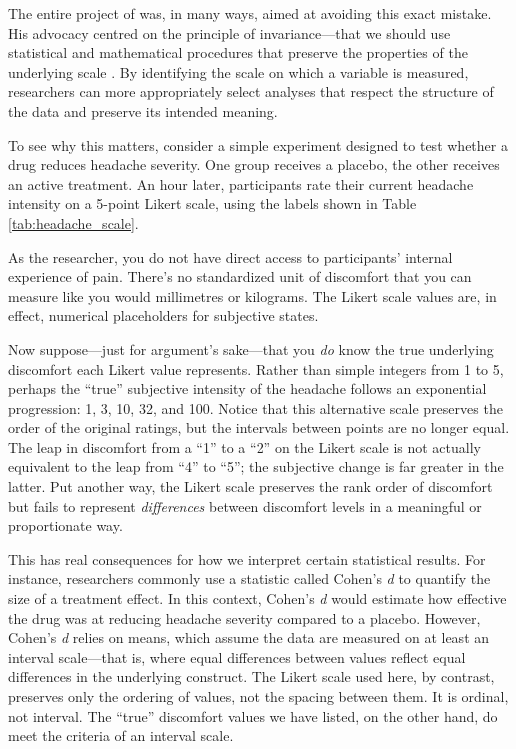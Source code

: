 The entire project of \textcite{Stevens1946} was, in many ways, aimed at avoiding this exact mistake. His advocacy centred on the principle of invariance—that we should use statistical and mathematical procedures that preserve the properties of the underlying scale \parencite{Stevens1968}. By identifying the scale on which a variable is measured, researchers can more appropriately select analyses that respect the structure of the data and preserve its intended meaning.

To see why this matters, consider a simple experiment designed to test whether a drug reduces headache severity. One group receives a placebo, the other receives an active treatment. An hour later, participants rate their current headache intensity on a 5-point Likert scale, using the labels shown in Table \ref{tab:headache_scale}.

\vspace{2em}



\vspace{1em}

\noindent
As the researcher, you do not have direct access to participants’ internal experience of pain. There's no standardized unit of discomfort that you can measure like you would millimetres or kilograms. The Likert scale values are, in effect, numerical placeholders for subjective states.

Now suppose—just for argument’s sake—that you \textit{do} know the true underlying discomfort each Likert value represents. Rather than simple integers from 1 to 5, perhaps the ``true'' subjective intensity of the headache follows an exponential progression: 1, 3, 10, 32, and 100. Notice that this alternative scale preserves the order of the original ratings, but the intervals between points are no longer equal. The leap in discomfort from a “1” to a “2” on the Likert scale is not actually equivalent to the leap from “4” to “5”; the subjective change is far greater in the latter. Put another way, the Likert scale preserves the rank order of discomfort but fails to represent \textit{differences} between discomfort levels in a meaningful or proportionate way.

This has real consequences for how we interpret certain statistical results. For instance, researchers commonly use a statistic called Cohen’s \textit{d} to quantify the size of a treatment effect. In this context, Cohen’s \textit{d} would estimate how effective the drug was at reducing headache severity compared to a placebo. However, Cohen’s \textit{d} relies on means, which assume the data are measured on at least an interval scale—that is, where equal differences between values reflect equal differences in the underlying construct. The Likert scale used here, by contrast, preserves only the ordering of values, not the spacing between them. It is ordinal, not interval. The ``true'' discomfort values we have listed, on the other hand, do meet the criteria of an interval scale.

